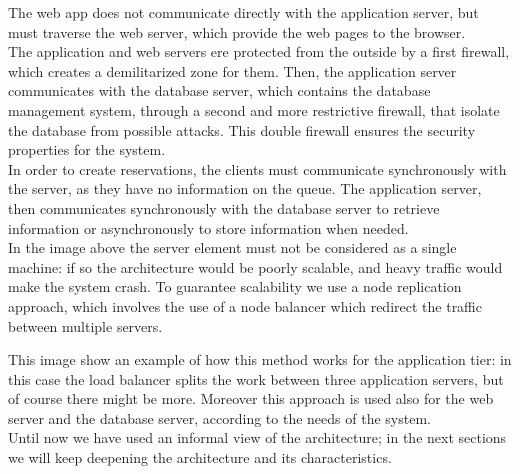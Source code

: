 The web app does not communicate directly with the application server, but must traverse the web server, which provide the web pages to the browser.\\
The application and web servers ere protected from the outside by a first firewall, which creates a demilitarized zone for them. Then, the application server communicates with the database server, which contains the database management system, through a second and more restrictive firewall, that isolate the database from possible attacks. This double firewall ensures the security properties for the system.\\
In order to create reservations, the clients must communicate synchronously with the server, as they have no information on the queue. The application server, then communicates synchronously with the database server to retrieve information or asynchronously to store information when needed.\\
In the image above the server element must not be considered as a single machine: if so the architecture would be poorly scalable, and heavy traffic would make the system crash. To guarantee scalability we use a node replication approach, which involves the use of a node balancer which redirect the traffic between multiple servers.\newpage
\begin{figure}[h]
	\noindent
\end{figure}
This image show an example of how this method works for the application tier: in this case the load balancer splits the work between three application servers, but of course there might be more. Moreover this approach is used also for the web server and the database server, according to the needs of the system.\\
Until now we have used an informal view of the architecture; in the next sections we will keep deepening the architecture and its characteristics.\newpage
